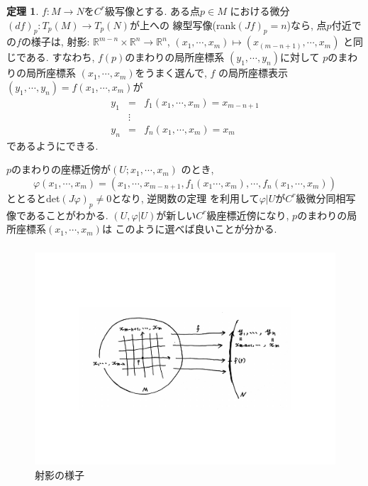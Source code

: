 \documentclass[dvipdfmx,cjk]{beamer}
\theoremstyle{definition}
\newtheorem{thm}[dfn]{\textbf{ 定理 }}
\begin{document}
\begin{frame}
  \frametitle{}
  \begin{thm}\label{theo: projection theorem}
    $f:M\to N$を$C^r$級写像とする. ある点$p\in M$
    における微分$(df)_p:T_p(M)\to T_p(N)$が上への
    線型写像(rank$(Jf)_p=n$)なら, 点$p$付近での$f$の様子は, 射影:
    $\mathbb{R}^{m-n} \times \mathbb{R}^n \to \mathbb{R}^n$, 
    $(x_1, \cdots ,x_m)\mapsto (x_(m-n+1), \cdots ,x_m)$
    と同じである. すなわち, $f(p)$のまわりの局所座標系
    $(y_1, \cdots ,y_n)$に対して
    $p$のまわりの局所座標系
    $(x_1,\cdots ,x_m)$をうまく選んで, $f$
    の局所座標表示
    $(y_1, \cdots ,y_n)=f(x_1,\cdots,x_m)$が
    \begin{eqnarray*}
        y_1&=&f_1(x_1,\cdots ,x_m)=x_{m-n+1}\\
        &\vdots& \\
        y_n&=&f_n(x_1,\cdots ,x_m)=x_m
    \end{eqnarray*}
    であるようにできる. 
  \end{thm}
\end{frame}

\begin{frame}
  $p$のまわりの座標近傍が$(U;x_1, \cdots ,x_m)$
  のとき, 
  $$\varphi(x_1,\cdots ,x_m)=
  (x_1,\cdots ,x_{m-n+1},f_1(x_1\cdots ,x_m),\cdots
  ,f_n(x_1,\cdots ,x_m))$$
  ととるとdet$(J\varphi)_p\neq 0$となり, 逆関数の定理
  を利用して$\varphi|U$が$C^r$級微分同相写像であることがわかる. 
  $(U,\varphi|U)$が新しい$C^r$級座標近傍になり, 
  $p$のまわりの局所座標系$(x_1,\cdots ,x_m)$は
  このように選べば良いことが分かる.
  \frametitle{}
  \begin{figure}[H]
    \centering
    \includegraphics[keepaspectratio, scale=0.4]{projectionTheorem.pdf}
    \caption{射影の様子}
    \label{projectionTheorem}
   \end{figure}
\end{frame}
\end{document}
